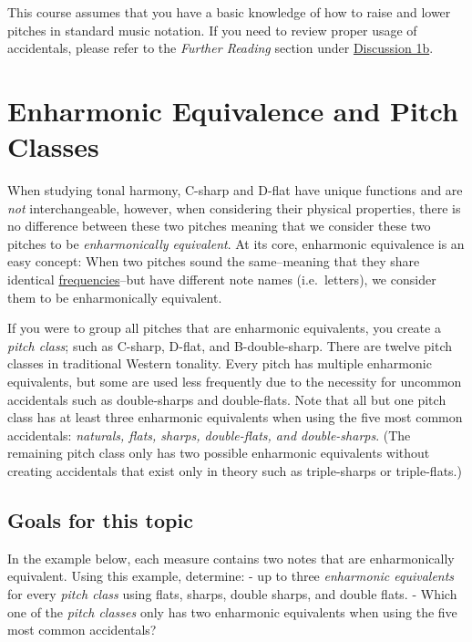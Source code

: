 \documentclass{book}
\begin{document}
This course assumes that you have a basic knowledge of how to raise and lower
pitches in standard music notation. If you need to review proper usage of
accidentals, please refer to the \emph{Further Reading} section under
\href{01-pitches-clefs//b2-labelingpitches.html}{Discussion 1b}.

\hypertarget{enharmonic-equivalence-and-pitch-classes}{%
\section{Enharmonic Equivalence and Pitch
Classes}\label{enharmonic-equivalence-and-pitch-classes}}

When studying tonal harmony, C-sharp and D-flat have unique functions and are
\emph{not} interchangeable, however, when considering their physical
properties, there is no difference between these two pitches meaning that we
consider these two pitches to be \emph{enharmonically equivalent}. At its
core, enharmonic equivalence is an easy concept: When two pitches sound the
same--meaning that they share identical
\href{https://amazing-space.stsci.edu/resources/explorations/groundup/lesson/glossary/term-full.php?t=wavelength_and_frequency}{frequencies}--but
have different note names (i.e.~letters), we consider them to be
enharmonically equivalent.

If you were to group all pitches that are enharmonic equivalents, you create a
\emph{pitch class}; such as C-sharp, D-flat, and B-double-sharp. There are
twelve pitch classes in traditional Western tonality. Every pitch has multiple
enharmonic equivalents, but some are used less frequently due to the necessity
for uncommon accidentals such as double-sharps and double-flats. Note that all
but one pitch class has at least three enharmonic equivalents when using the
five most common accidentals: \emph{naturals, flats, sharps, double-flats, and
double-sharps}. (The remaining pitch class only has two possible enharmonic
equivalents without creating accidentals that exist only in theory such as
triple-sharps or triple-flats.)

\hypertarget{goals-for-this-topic-8}{%
\subsection{Goals for this topic}\label{goals-for-this-topic-8}}

In the example below, each measure contains two notes that are enharmonically
equivalent. Using this example, determine: - up to three \emph{enharmonic
equivalents} for every \emph{pitch class} using flats, sharps, double sharps,
and double flats. - Which one of the \emph{pitch classes} only has two
enharmonic equivalents when using the five most common accidentals?
\end{document}
